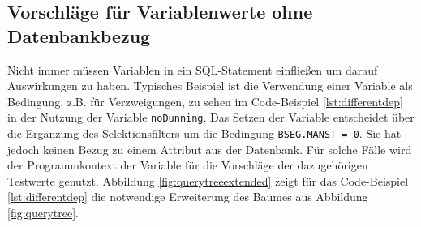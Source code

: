 %
%
%

%

\subsection{Vorschläge für Variablenwerte ohne Datenbankbezug}
Nicht immer müssen Variablen in ein SQL-Statement einfließen um darauf Auswirkungen zu haben.
Typisches Beispiel ist die Verwendung einer Variable als Bedingung, z.B. für Verzweigungen, zu sehen im Code-Beispiel \ref{lst:differentdep} in der Nutzung der Variable \texttt{noDunning}.
Das Setzen der Variable entscheidet über die Ergänzung des Selektionsfilters um die Bedingung \texttt{BSEG.MANST = 0}.
Sie hat jedoch keinen Bezug zu einem Attribut aus der Datenbank.
Für solche Fälle wird der Programmkontext der Variable für die Vorschläge der dazugehörigen Testwerte genutzt.
Abbildung \ref{fig:querytreeextended} zeigt für das Code-Beispiel \ref{lst:differentdep} die notwendige Erweiterung des Baumes aus Abbildung \ref{fig:querytree}.

